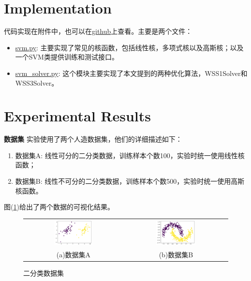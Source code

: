 \documentclass[11pt]{article}
\begin{document}
\section{Implementation}
代码实现在附件中，也可以在\href{https://github.com/irlyue/MLAlg}{github}上查看。主要是两个文件：
\begin{itemize}
\item \href{https://github.com/Irlyue/MLAlg/blob/master/code/svm/svm.py}{svm.py}: 主要实现了常见的核函数，包括线性核，多项式核以及高斯核；以及一个SVM类提供训练和测试接口。
\item\href{https://github.com/Irlyue/MLAlg/blob/master/code/svm/svm_solver.py}{svm\_solver.py}: 这个模块主要实现了本文提到的两种优化算法，WSS1Solver和WSS3Solver。
\end{itemize}
\section{Experimental Results}
\textbf{数据集 }实验使用了两个人造数据集，他们的详细描述如下：
\begin{enumerate}
	\item 数据集A: 线性可分的二分类数据，训练样本个数100，实验时统一使用线性核函数；
	\item 数据集B: 线性不可分的二分类数据，训练样本个数500，实验时统一使用高斯核函数。
\end{enumerate}
图(\ref{data})给出了两个数据的可视化结果。
\begin{figure}
	\centering
	\setlength{\tabcolsep}{0.05\textwidth}
	\begin{tabular}{cc}
		\includegraphics[width=0.4\textwidth]{images/img15.png} & 
		\includegraphics[width=0.4\textwidth]{images/img17.png}\\
		(a)数据集A & (b)数据集B 
	\end{tabular}
	\caption{二分类数据集}
	\label{data}
\end{figure}
\end{document}
